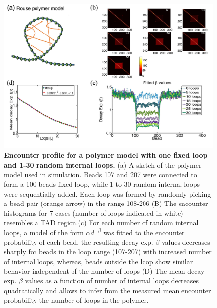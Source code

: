 \documentclass[12pt]{article}
\begin{document}
\begin{figure}[H]
\includegraphics[scale=0.5]{Figure03_OneTADWithTails0To30RandomLoops}
\caption{\textbf{Encounter profile for a polymer model with one fixed loop and 1-30 random internal loops.} (a) A sketch of the polymer model used in simulation. Beads 107 and 207 were connected to form a 100 beads fixed loop, while 1 to 30 random internal loops were sequentially added. Each loop was formed by randomly picking a bead pair (orange arrow) in the range 108-206 (B) The encounter histograms for 7 cases (number of loops indicated in white) resembles a TAD region.(c) For each number of random internal loops, a model of the form $\alpha d^{-\beta}$ was fitted to the encounter probability of each bead, the resulting decay exp. $\beta$ values decreases sharply for beads in the loop range (107-207) with increased number of internal loops, whereas, beads outside the loop show similar behavior independent of the number of loops (D) The mean decay exp. $\beta$ values as a function of number of internal loops decreases quadratically and allows to infer from the measured mean encounter probability the number of loops in the polymer.}
\label{figure_encounterProfileOneTADWithTails}
\end{figure}
\end{document}
